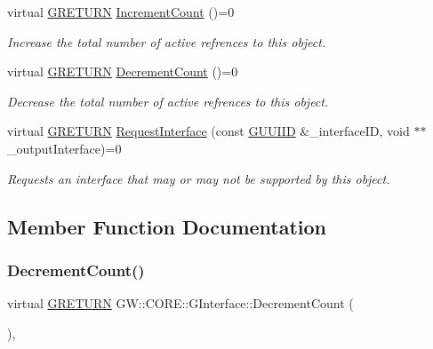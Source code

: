 \begin{DoxyCompactItemize}
virtual \hyperlink{namespace_g_w_a69b1aaebac1cac8049825f035884c95b}{G\+R\+E\+T\+U\+RN} \hyperlink{class_g_w_1_1_c_o_r_e_1_1_g_interface_a3e04e58eef4f3e3f56ff7fb751194c37}{Increment\+Count} ()=0
\begin{DoxyCompactList}\small\item\em Increase the total number of active refrences to this object. \end{DoxyCompactList}\item 
virtual \hyperlink{namespace_g_w_a69b1aaebac1cac8049825f035884c95b}{G\+R\+E\+T\+U\+RN} \hyperlink{class_g_w_1_1_c_o_r_e_1_1_g_interface_af6924e12b14f217b518fc91c63d9703d}{Decrement\+Count} ()=0
\begin{DoxyCompactList}\small\item\em Decrease the total number of active refrences to this object. \end{DoxyCompactList}\item 
virtual \hyperlink{namespace_g_w_a69b1aaebac1cac8049825f035884c95b}{G\+R\+E\+T\+U\+RN} \hyperlink{class_g_w_1_1_c_o_r_e_1_1_g_interface_ab1414aa07bca310a824ee01a91657ad0}{Request\+Interface} (const \hyperlink{struct_g_w_1_1_g_u_u_i_i_d}{G\+U\+U\+I\+ID} \&\+\_\+interface\+ID, void $\ast$$\ast$\+\_\+output\+Interface)=0
\begin{DoxyCompactList}\small\item\em Requests an interface that may or may not be supported by this object. \end{DoxyCompactList}\end{DoxyCompactItemize}


\subsection{Member Function Documentation}
\hypertarget{class_g_w_1_1_c_o_r_e_1_1_g_interface_af6924e12b14f217b518fc91c63d9703d}{}\label{class_g_w_1_1_c_o_r_e_1_1_g_interface_af6924e12b14f217b518fc91c63d9703d} 
\subsubsection{\texorpdfstring{Decrement\+Count()}{DecrementCount()}}
{\footnotesize\ttfamily virtual \hyperlink{namespace_g_w_a69b1aaebac1cac8049825f035884c95b}{G\+R\+E\+T\+U\+RN} G\+W\+::\+C\+O\+R\+E\+::\+G\+Interface\+::\+Decrement\+Count (\begin{DoxyParamCaption}{ }\end{DoxyParamCaption})\hspace{0.3cm}{\ttfamily [pure virtual]}, {\ttfamily [inherited]}}

